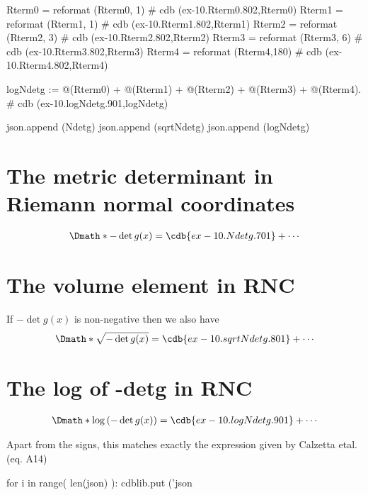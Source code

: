 \documentclass[12pt]{cdblatex}
\begin{document}
\begin{cadabra}
   Rterm0 = reformat (Rterm0,  1)    # cdb (ex-10.Rterm0.802,Rterm0)
   Rterm1 = reformat (Rterm1,  1)    # cdb (ex-10.Rterm1.802,Rterm1)
   Rterm2 = reformat (Rterm2,  3)    # cdb (ex-10.Rterm2.802,Rterm2)
   Rterm3 = reformat (Rterm3,  6)    # cdb (ex-10.Rterm3.802,Rterm3)
   Rterm4 = reformat (Rterm4,180)    # cdb (ex-10.Rterm4.802,Rterm4)

   logNdetg := @(Rterm0) + @(Rterm1) + @(Rterm2) + @(Rterm3) + @(Rterm4).  # cdb (ex-10.logNdetg.901,logNdetg)

   json.append (Ndetg)
   json.append (sqrtNdetg)
   json.append (logNdetg)

\end{cadabra}

\clearpage

\section*{The metric determinant in Riemann normal coordinates}

\def\Vert{\vrule height 10pt depth 3pt width 0.5pt}
\def\LVert{\Vert\hskip 1.75pt}
\def\RVert{\hskip 1pt\Vert}

\begin{dgroup*}
   \Dmath*{-\det g(x) = \cdb{ex-10.Ndetg.701}+\cdots}
\end{dgroup*}

\section*{The volume element in RNC}

If $-\det g(x)$ is non-negative then we also have
%
\begin{dgroup*}
   \Dmath*{\sqrt{-\det g(x)} = \cdb{ex-10.sqrtNdetg.801}+\cdots}
\end{dgroup*}

\section*{The log of -detg in RNC}
%
\begin{dgroup*}
   \Dmath*{\log\left(-\det g(x)\right) = \cdb{ex-10.logNdetg.901}+\cdots}
\end{dgroup*}

Apart from the signs, this matches exactly the expression given by Calzetta etal. (eq. A14)

\clearpage


\bgroup
{}
\begin{cadabra}
   for i in range( len(json) ):
      cdblib.put ('json%
\end{cadabra}
\egroup
\end{document}
